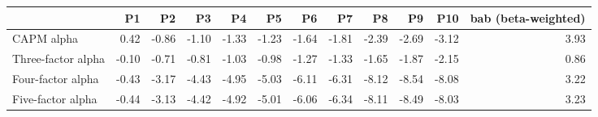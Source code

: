 \begin{tabular}{lrrrrrrrrrrr}
\toprule
{} &    P1 &    P2 &    P3 &    P4 &    P5 &    P6 &    P7 &    P8 &    P9 &   P10 &  bab (beta-weighted) \\
\midrule
CAPM alpha         &  0.42 & -0.86 & -1.10 & -1.33 & -1.23 & -1.64 & -1.81 & -2.39 & -2.69 & -3.12 &                 3.93 \\
Three-factor alpha & -0.10 & -0.71 & -0.81 & -1.03 & -0.98 & -1.27 & -1.33 & -1.65 & -1.87 & -2.15 &                 0.86 \\
Four-factor alpha  & -0.43 & -3.17 & -4.43 & -4.95 & -5.03 & -6.11 & -6.31 & -8.12 & -8.54 & -8.08 &                 3.22 \\
Five-factor alpha  & -0.44 & -3.13 & -4.42 & -4.92 & -5.01 & -6.06 & -6.34 & -8.11 & -8.49 & -8.03 &                 3.23 \\
\bottomrule
\end{tabular}
